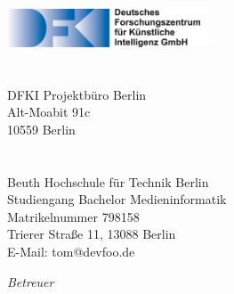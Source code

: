 \begin{titlepage}
	\tgherosfont
	\centering

	{\Large \thesisUniversity} \\[4mm]
	\includegraphics[width=6cm]{gfx/DFKI_Schrift_de} \\[2mm]
	\textsf{\thesisUniversityDepartment} \\
	\textsf{\thesisUniversityInstitute} \\[5mm]
    {\normalsize DFKI Projektbüro Berlin}\\
    {\normalsize Alt-Moabit 91c}\\
    {\normalsize 10559 Berlin}\\
	\vfill
	{\LARGE \color{ctcolortitle}\textbf{\thesisTitle} \\[10mm]}
	{\Large \thesisName} \\[5mm]
	{\normalsize Beuth Hochschule für Technik Berlin} \\
	{\normalsize Studiengang Bachelor Medieninformatik} \\
	{\normalsize Matrikelnummer 798158} \\
	{\normalsize Trierer Straße 11, 13088 Berlin} \\
	{\normalsize E-Mail: tom@devfoo.de} \\

	\vfill
	\begin{minipage}[t]{.27\textwidth}
		\raggedleft
		\textit{Betreuer}
	\end{minipage}
	\hspace*{15pt}
	\begin{minipage}[t]{.65\textwidth}
		{\Large \thesisFirstReviewer} \\
	  	{\small \thesisFirstReviewerDepartment} \\[-1mm]
		{\small \thesisFirstReviewerUniversity}
	\end{minipage} \\[5mm]
	\begin{minipage}[t]{.27\textwidth}
		\raggedleft
		\textit{ }
	\end{minipage}
	\hspace*{15pt}
	\begin{minipage}[t]{.65\textwidth}
		{\Large \thesisSecondReviewer} \\
	  	{\small \thesisSecondReviewerDepartment} \\[-1mm]
		{\small \thesisSecondReviewerUniversity}
	\end{minipage} \\[10mm]
	\thesisDate \\
\end{titlepage}
